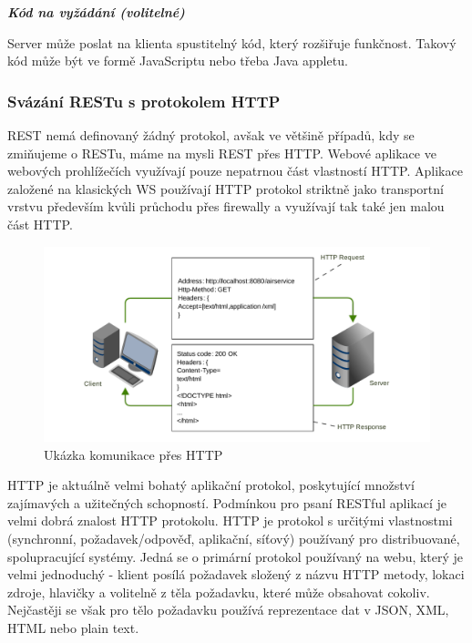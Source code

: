 \documentclass[11pt,twoside,a4paper]{book}
\begin{document}
\textbf{\textit{Kód na vyžádání (volitelné)}}

Server může poslat na klienta spustitelný kód, který rozšiřuje funkčnost. Takový kód může
být ve formě JavaScriptu nebo třeba Java appletu.

\subsubsection{Svázání RESTu s protokolem HTTP}

REST nemá definovaný žádný protokol, avšak ve většině případů, kdy se zmiňujeme o
RESTu, máme na mysli REST přes HTTP. Webové aplikace ve webových prohlížečích 
využívají pouze nepatrnou část vlastností HTTP. Aplikace založené na klasických WS
používají HTTP protokol striktně jako transportní vrstvu především kvůli průchodu přes
firewally a využívají tak také jen malou část HTTP.

\begin{figure}[h]
\begin{center}
\includegraphics[width=13cm]{images-pdf/http.pdf}
\caption{Ukázka komunikace přes HTTP}
\label{fig:logo}
\end{center}
\end{figure}

HTTP je aktuálně velmi bohatý aplikační protokol, poskytující množství zajímavých a
užitečných schopností. Podmínkou pro psaní RESTful aplikací je velmi dobrá znalost HTTP
protokolu. HTTP je protokol s určitými vlastnostmi (synchronní, požadavek/odpověď,
aplikační, síťový) používaný pro distribuované, spolupracující systémy. Jedná se o primární
protokol používaný na webu, který je velmi jednoduchý - klient posílá požadavek složený z
názvu HTTP metody, lokaci zdroje, hlavičky a volitelně z těla požadavku, které může
obsahovat cokoliv. Nejčastěji se však pro tělo požadavku používá reprezentace dat v JSON,
XML, HTML nebo plain text.
\end{document}
